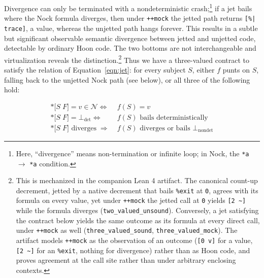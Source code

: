 \documentclass[twoside]{article}
\begin{document}
\noindent
Divergence can only be terminated with a nondeterministic crash;\footnote{Here, ``divergence'' means non-termination or infinite loop; in Nock, the \texttt{*a} $\rightarrow$ \texttt{*a} condition.} if a jet bails where the Nock formula diverges, then under \lstinline[style=inlinecode]{++mock} the jetted path returns \lstinline[style=inlinecode]{[%| trace]}, a value, whereas the unjetted path hangs forever.  This results in a subtle but significant observable semantic divergence between jetted and unjetted code, detectable by ordinary Hoon code.  The two bottoms are not interchangeable and virtualization reveals the distinction.\footnote{This is mechanized in the companion Lean 4 artifact.  The canonical count-up decrement, jetted by a native decrement that bails \texttt{\%exit} at \texttt{0}, agrees with its formula on every value, yet under \texttt{++mock} the jetted call at \texttt{0} yields \texttt{[2 \textasciitilde]} while the formula diverges (\texttt{two\_valued\_unsound}).  Conversely, a jet satisfying the contract below yields the same outcome as its formula at every direct call, under \texttt{++mock} as well (\texttt{three\_valued\_sound}, \texttt{three\_valued\_mock}).  The artifact models \texttt{++mock} as the observation of an outcome (\texttt{[0 v]} for a value, \texttt{[2 \textasciitilde]} for an \texttt{\%exit}, nothing for divergence) rather than as Hoon code, and proves agreement at the call site rather than under arbitrary enclosing contexts.}  Thus we have a three-valued contract to satisfy the relation of Equation~\ref{eqn:jet}:  for every subject $S$, either $f$ punts on $S$, falling back to the unjetted Nock path (see below), or all three of the following hold:

\begin{subequations}
  \begin{align}
    \texttt{*[}S\; F\texttt{]} = v \in \mathcal{N} \iff & f(S) = v \label{eqn:contract1} \\
    \texttt{*[}S\; F\texttt{]} = \bot_\text{det} \iff & f(S) \text{ bails deterministically} \label{eqn:contract2} \\
    \texttt{*[}S\; F\texttt{]} \text{ diverges} \;\Longrightarrow\; & f(S) \text{ diverges or bails } \bot_\text{nondet} \label{eqn:contract3}
  \end{align}
\end{subequations}
\end{document}
